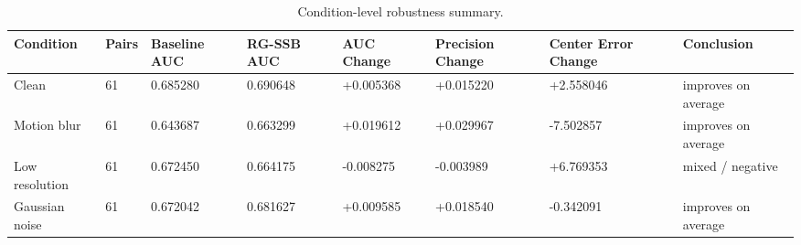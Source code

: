 \begin{table}[t]
\centering
\caption{Condition-level robustness summary.}
\label{tab:conditions}
\begin{tabular}{llllllll}
\toprule
Condition & Pairs & Baseline AUC & RG-SSB AUC & AUC Change & Precision Change & Center Error Change & Conclusion \\
\midrule
Clean & 61 & 0.685280 & 0.690648 & +0.005368 & +0.015220 & +2.558046 & improves on average \\
Motion blur & 61 & 0.643687 & 0.663299 & +0.019612 & +0.029967 & -7.502857 & improves on average \\
Low resolution & 61 & 0.672450 & 0.664175 & -0.008275 & -0.003989 & +6.769353 & mixed / negative \\
Gaussian noise & 61 & 0.672042 & 0.681627 & +0.009585 & +0.018540 & -0.342091 & improves on average \\
\bottomrule
\end{tabular}
\end{table}
